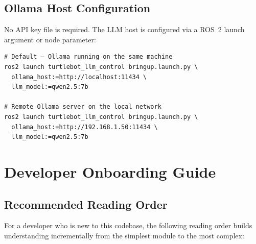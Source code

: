 \documentclass[12pt,a4paper]{report}
\begin{document}
\section{Ollama Host Configuration}

No API key file is required.  The LLM host is configured via a ROS~2 launch
argument or node parameter:

\begin{lstlisting}[style=bashstyle, caption={Configuring the Ollama endpoint}]
# Default — Ollama running on the same machine
ros2 launch turtlebot_llm_control bringup.launch.py \
  ollama_host:=http://localhost:11434 \
  llm_model:=qwen2.5:7b

# Remote Ollama server on the local network
ros2 launch turtlebot_llm_control bringup.launch.py \
  ollama_host:=http://192.168.1.50:11434 \
  llm_model:=qwen2.5:7b
\end{lstlisting}

\chapter{Developer Onboarding Guide}
\label{ch:onboarding}

\section{Recommended Reading Order}

For a developer who is new to this codebase, the following reading order
builds understanding incrementally from the simplest module to the most
complex:
\end{document}
